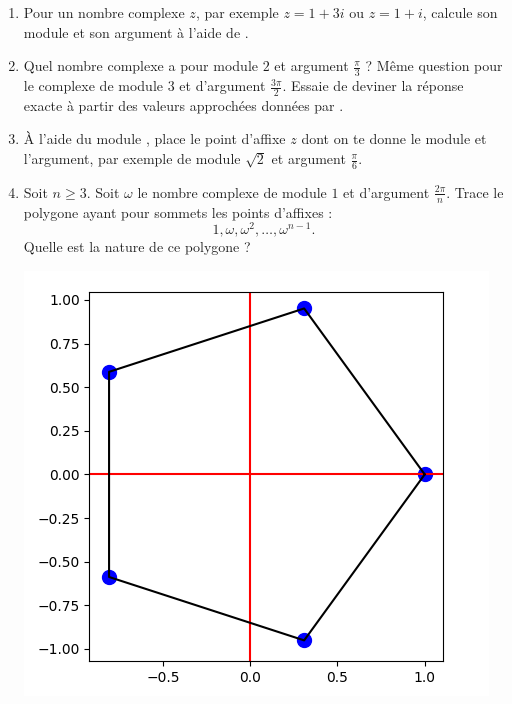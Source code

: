 \documentclass[11pt,class=report,crop=false]{standalone}
\begin{document}
\begin{activite}


\begin{enumerate}
  \item Pour un nombre complexe $z$, par exemple $z=1+3i$ ou $z=1+i$, calcule son module et son argument à l'aide de \Python. 
  
  \item Quel nombre complexe a pour module $2$ et argument $\frac\pi3$ ? Même question pour le complexe de module $3$ et d'argument $\frac{3\pi}{2}$. Essaie de deviner la réponse exacte à partir des valeurs approchées données par \Python.
  
  \item \`A l'aide du module , place le point d'affixe $z$ dont on te donne le module et l'argument, par exemple de module $\sqrt2$ et argument $\frac\pi6$.
  
  \item Soit $n\ge3$. Soit $\omega$ le nombre complexe de module $1$ et d'argument $\frac{2\pi}{n}$. 
  Trace le polygone ayant pour sommets les points d'affixes :
  $$1, \omega, \omega^2, \ldots, \omega^{n-1}.$$
  Quelle est la nature de ce polygone ?
  
  
\begin{center}
\includegraphics[scale=\myscale,scale=0.5]{ecran-complexes2-1}
\end{center}	 
  
   
\end{enumerate} 
\end{activite}
\end{document}
